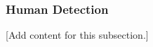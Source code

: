 
\subsubsection{Human Detection}
\label{subsubsec:design_4_5_human_detection}

[Add content for this subsection.]
